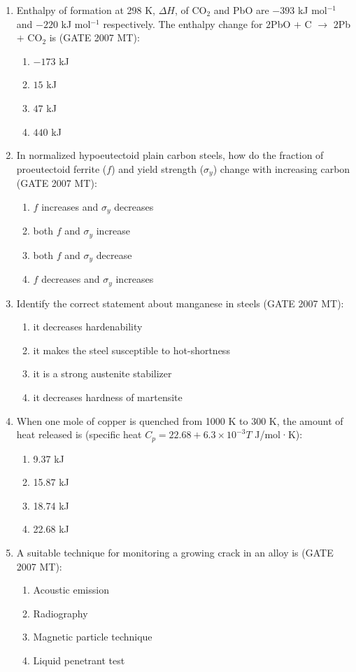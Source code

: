 \documentclass[12pt]{article}
\begin{document}
\begin{enumerate}

\item Enthalpy of formation at 298 K, $\Delta H$, of CO$_2$ and PbO are $-393$ kJ mol$^{-1}$ and $-220$ kJ mol$^{-1}$ respectively. The enthalpy change for $2$PbO $+$ C $\rightarrow$ $2$Pb $+$ CO$_2$ is (GATE 2007 MT):  
  \begin{enumerate}[label=(\Alph*)]
    \item $-173$ kJ
    \item $15$ kJ
    \item $47$ kJ
    \item $440$ kJ
  \end{enumerate}

\item In normalized hypoeutectoid plain carbon steels, how do the fraction of proeutectoid ferrite ($f$) and yield strength ($\sigma_y$) change with increasing carbon (GATE 2007 MT):  
  \begin{enumerate}[label=(\Alph*)]
    \item $f$ increases and $\sigma_y$ decreases
    \item both $f$ and $\sigma_y$ increase
    \item both $f$ and $\sigma_y$ decrease
    \item $f$ decreases and $\sigma_y$ increases
  \end{enumerate}

\item Identify the correct statement about manganese in steels (GATE 2007 MT):  
  \begin{enumerate}[label=(\Alph*)]
    \item it decreases hardenability
    \item it makes the steel susceptible to hot-shortness
    \item it is a strong austenite stabilizer
    \item it decreases hardness of martensite
  \end{enumerate}

\item When one mole of copper is quenched from 1000 K to 300 K, the amount of heat released is (specific heat $C_p = 22.68 + 6.3 \times 10^{-3} T$ J/mol·K):  
  \begin{enumerate}[label=(\Alph*)]
    \item 9.37 kJ
    \item 15.87 kJ
    \item 18.74 kJ
    \item 22.68 kJ
  \end{enumerate}

\item A suitable technique for monitoring a growing crack in an alloy is (GATE 2007 MT):  
  \begin{enumerate}[label=(\Alph*)]
    \item Acoustic emission
    \item Radiography
    \item Magnetic particle technique
    \item Liquid penetrant test
  \end{enumerate}

\end{enumerate}
\end{document}
